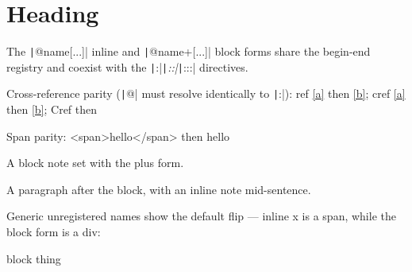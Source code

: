 \section{Heading \label{a} \label{b}}

The \texttt|@name[...]| inline and \texttt|@name+[...]| block forms share the begin-end
registry and coexist with the \texttt|:|\emph{\texttt|::|}\texttt|:::| directives.

Cross-reference parity (\texttt|@| must resolve identically to \texttt|:|):
ref \ref{a} then \ref{b}; cref \cref{a} then \cref{b}; Cref  then 

Span parity: <span>hello</span> then hello

\begin{note}
A block note set with the plus form.
\end{note}

A paragraph after the block, with an inline note mid-sentence.

Generic unregistered names show the default flip — inline x is a span,
while the block form is a div:

\begin{thing}
block thing
\end{thing}

